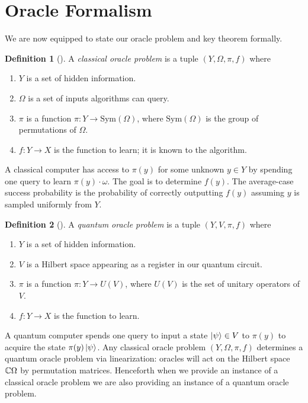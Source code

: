 \documentclass[12pt,twoside]{reedthesis}
\theoremstyle{plain}   %
\theoremstyle{definition}
\newtheorem{defn}{Definition}[section]
\theoremstyle{remark}
\numberwithin{equation}{section}
\def\Sym{\mathrm{Sym}}
\begin{document}
  \section{Oracle Formalism}
  We are now equipped to state our oracle problem and key theorem formally.
  \begin{defn}[{\cite[Section 2]{copeland}}]
    A \emph{classical oracle problem} is a tuple $(Y, \Omega, \pi, f)$ where
    \begin{enumerate}
    \item $Y$ is a set of hidden information.
    \item $\Omega$ is a set of inputs algorithms can query.
    \item $\pi$ is a function $\pi: Y \to \Sym(\Omega )$, where $\Sym(\Omega)$ is the group of permutations of $\Omega$.
    \item $f: Y \to X$ is the function to learn; it is known to the algorithm. 
    \end{enumerate}
    A classical computer has access to $\pi(y)$ for some unknown $y \in Y$ by spending one query to learn $\pi(y) \cdot \omega$.
    The goal is to determine $f(y)$.
    The average-case success probability is the probability of correctly outputting $f(y)$ assuming $y$ is sampled uniformly from $Y$.
  \end{defn}
  \begin{defn}[{\cite[Section 2]{copeland}}]
    A \emph{quantum oracle problem} is a tuple $(Y, V, \pi, f)$ where
    \begin{enumerate}
    \item $Y$ is a set of hidden information.
    \item $V$ is a Hilbert space appearing as a register in our quantum circuit.
    \item $\pi$ is a function $\pi: Y \to U(V)$, where $U(V)$ is the set of unitary operators of $V$.
    \item $f: Y \to X$ is the function to learn.
    \end{enumerate}
    A quantum computer spends one query to input a state $\ket{\psi} \in V$ to $\pi(y)$ to acquire the state $\pi(y) \ket{\psi}$.
    Any classical oracle problem $(Y,\Omega, \pi, f)$ determines a quantum oracle problem via linearization:
    oracles will act on the Hilbert space $\mathbb{C} \Omega$ by permutation matrices.
    Henceforth when we provide an instance of a classical oracle problem we are also providing an instance of a quantum oracle problem.
  \end{defn}
\end{document}
